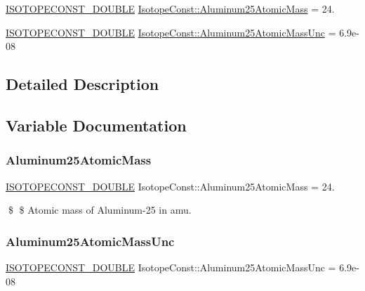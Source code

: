 \begin{DoxyCompactItemize}
\item 
\mbox{\hyperlink{group___isotope_const-_macros_ga8f45a7272ce02c0b4c65c44636ed719a}{I\+S\+O\+T\+O\+P\+E\+C\+O\+N\+S\+T\+\_\+\+D\+O\+U\+B\+LE}} \mbox{\hyperlink{group___isotope_const-_aluminum-_al25_ga77283e2aea3158f24d1f6ce9e2055425}{Isotope\+Const\+::\+Aluminum25\+Atomic\+Mass}} = 24.
\item 
\mbox{\hyperlink{group___isotope_const-_macros_ga8f45a7272ce02c0b4c65c44636ed719a}{I\+S\+O\+T\+O\+P\+E\+C\+O\+N\+S\+T\+\_\+\+D\+O\+U\+B\+LE}} \mbox{\hyperlink{group___isotope_const-_aluminum-_al25_ga5df7f1249fe09d3533cb4b7e4960804b}{Isotope\+Const\+::\+Aluminum25\+Atomic\+Mass\+Unc}} = 6.\+9e-\/08
\end{DoxyCompactItemize}


\subsection{Detailed Description}


\subsection{Variable Documentation}
\mbox{\label{group___isotope_const-_aluminum-_al25_ga77283e2aea3158f24d1f6ce9e2055425}} 
\subsubsection{\texorpdfstring{Aluminum25\+Atomic\+Mass}{Aluminum25AtomicMass}}
{\footnotesize\ttfamily \mbox{\hyperlink{group___isotope_const-_macros_ga8f45a7272ce02c0b4c65c44636ed719a}{I\+S\+O\+T\+O\+P\+E\+C\+O\+N\+S\+T\+\_\+\+D\+O\+U\+B\+LE}} Isotope\+Const\+::\+Aluminum25\+Atomic\+Mass = 24.}

\$ \$ Atomic mass of Aluminum-\/25 in amu. \mbox{\label{group___isotope_const-_aluminum-_al25_ga5df7f1249fe09d3533cb4b7e4960804b}} 
\subsubsection{\texorpdfstring{Aluminum25\+Atomic\+Mass\+Unc}{Aluminum25AtomicMassUnc}}
{\footnotesize\ttfamily \mbox{\hyperlink{group___isotope_const-_macros_ga8f45a7272ce02c0b4c65c44636ed719a}{I\+S\+O\+T\+O\+P\+E\+C\+O\+N\+S\+T\+\_\+\+D\+O\+U\+B\+LE}} Isotope\+Const\+::\+Aluminum25\+Atomic\+Mass\+Unc = 6.\+9e-\/08}

